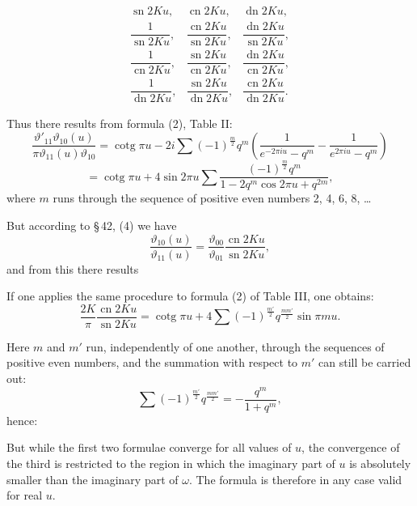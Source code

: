 \[
\begin{array}{lll}
\operatorname{sn}2Ku, & \operatorname{cn}2Ku, & \operatorname{dn}2Ku, \\[2mm]
\dfrac{1}{\operatorname{sn}2Ku}, & \dfrac{\operatorname{cn}2Ku}{\operatorname{sn}2Ku}, & \dfrac{\operatorname{dn}2Ku}{\operatorname{sn}2Ku}, \\[2mm]
\dfrac{1}{\operatorname{cn}2Ku}, & \dfrac{\operatorname{sn}2Ku}{\operatorname{cn}2Ku}, & \dfrac{\operatorname{dn}2Ku}{\operatorname{cn}2Ku}, \\[2mm]
\dfrac{1}{\operatorname{dn}2Ku}, & \dfrac{\operatorname{sn}2Ku}{\operatorname{dn}2Ku}, & \dfrac{\operatorname{cn}2Ku}{\operatorname{dn}2Ku}.
\end{array}
\]

Thus there results from formula (2), Table II:
\[
\frac{\vartheta'_{11}\vartheta_{10}(u)}{\pi\vartheta_{11}(u)\vartheta_{10}} = \operatorname{cotg}\pi u - 2i\sum(-1)^{\frac{m}{2}}q^m\left(\frac{1}{e^{-2\pi iu}-q^m} - \frac{1}{e^{2\pi iu}-q^m}\right)
\]
\[
= \operatorname{cotg}\pi u + 4\sin 2\pi u\sum\frac{(-1)^{\frac{m}{2}}q^m}{1-2q^m\cos 2\pi u+q^{2m}},
\]
where $m$ runs through the sequence of positive even numbers 2, 4, 6, 8, \dots{}

But according to \S\,42, (4) we have
\[
\frac{\vartheta_{10}(u)}{\vartheta_{11}(u)} = \frac{\vartheta_{00}}{\vartheta_{01}}\frac{\operatorname{cn}2Ku}{\operatorname{sn}2Ku},
\]
and from this there results

If one applies the same procedure to formula (2) of Table III, one obtains:
\[
\frac{2K}{\pi}\frac{\operatorname{cn}2Ku}{\operatorname{sn}2Ku} = \operatorname{cotg}\pi u + 4\sum(-1)^{\frac{m'}{2}}q^{\frac{mm'}{2}}\sin\pi mu.
\]

Here $m$ and $m'$ run, independently of one another, through the sequences of positive even numbers, and the summation with respect to $m'$ can still be carried out:
\[
\sum(-1)^{\frac{m'}{2}}q^{\frac{mm'}{2}} = -\frac{q^m}{1+q^m},
\]
hence:

But while the first two formulae converge for all values of $u$, the convergence of the third is restricted to the region in which the imaginary part of $u$ is absolutely smaller than the imaginary part of $\omega$. The formula is therefore in any case valid for real $u$.
